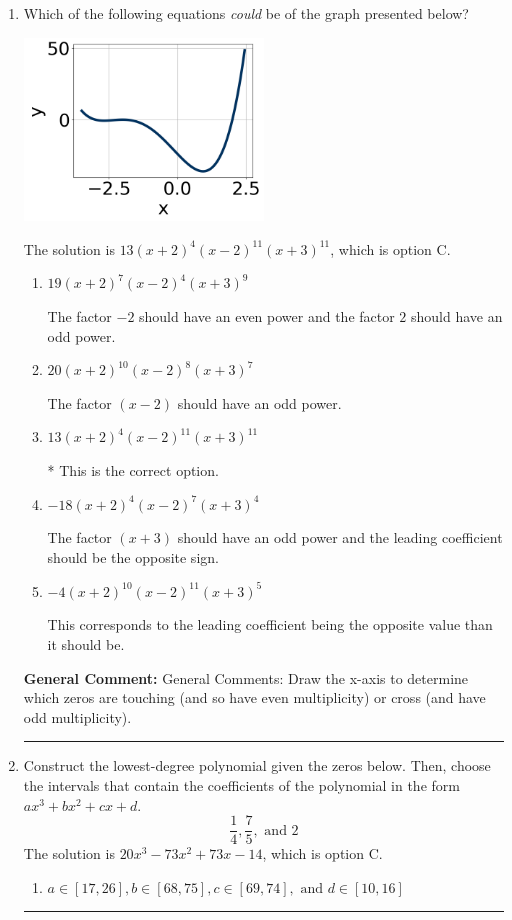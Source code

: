 \documentclass{extbook}[14pt]
\newcommand{\litem}[1]{\item #1

\rule{\textwidth}{0.4pt}}
\begin{document}
\begin{enumerate}\litem{
Which of the following equations \textit{could} be of the graph presented below?

\begin{center}
    \includegraphics[width=0.5\textwidth]{../Figures/polyGraphToFunctionB.png}
\end{center}


The solution is \( 13(x + 2)^{4} (x - 2)^{11} (x + 3)^{11} \), which is option C.\begin{enumerate}[label=\Alph*.]
\item \( 19(x + 2)^{7} (x - 2)^{4} (x + 3)^{9} \)

The factor $-2$ should have an even power and the factor $2$ should have an odd power.
\item \( 20(x + 2)^{10} (x - 2)^{8} (x + 3)^{7} \)

The factor $(x - 2)$ should have an odd power.
\item \( 13(x + 2)^{4} (x - 2)^{11} (x + 3)^{11} \)

* This is the correct option.
\item \( -18(x + 2)^{4} (x - 2)^{7} (x + 3)^{4} \)

The factor $(x + 3)$ should have an odd power and the leading coefficient should be the opposite sign.
\item \( -4(x + 2)^{10} (x - 2)^{11} (x + 3)^{5} \)

This corresponds to the leading coefficient being the opposite value than it should be.
\end{enumerate}

\textbf{General Comment:} General Comments: Draw the x-axis to determine which zeros are touching (and so have even multiplicity) or cross (and have odd multiplicity).
}
\litem{
Construct the lowest-degree polynomial given the zeros below. Then, choose the intervals that contain the coefficients of the polynomial in the form $ax^3+bx^2+cx+d$.
\[ \frac{1}{4}, \frac{7}{5}, \text{ and } 2 \]The solution is \( 20x^{3} -73 x^{2} +73 x -14 \), which is option C.\begin{enumerate}[label=\Alph*.]
\item \( a \in [17, 26], b \in [68, 75], c \in [69, 74], \text{ and } d \in [10, 16] \)


\end{enumerate}}
\end{enumerate}
\end{document}
